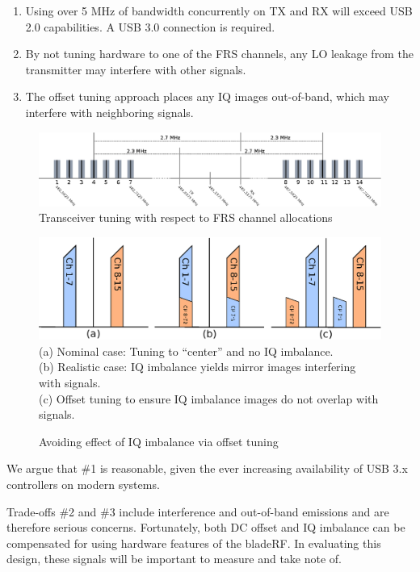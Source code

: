 \begin{enumerate}
    \item Using over 5 MHz of bandwidth concurrently on TX and RX will exceed USB 2.0 capabilities. A USB 3.0 connection is required.
    \item By not tuning hardware to one of the \ac{FRS} channels, any LO leakage from the transmitter may interfere with other signals.
    \item The offset tuning approach places any IQ images out-of-band, which may interfere with neighboring signals.
\end{enumerate}

\begin{figure}[t]
  \centering
  \includegraphics{images/frs/tuning.eps}
  \caption{Transceiver tuning with respect to FRS channel allocations}
  \label{fig:tuning}
\end{figure}

\begin{figure}[h]
  \centering
  \includegraphics[width=6in]{images/frs/iq_imbalance_offset_tuning.eps}
  \\
  \footnotesize{
    (a) Nominal case: Tuning to ``center'' and no IQ imbalance.\\
    (b) Realistic case: IQ imbalance yields mirror images interfering with signals.\\
    (c) Offset tuning to ensure IQ imbalance images do not overlap with signals.
  }
  \caption{Avoiding effect of IQ imbalance via offset tuning}
  \label{fig:iq_imbalance}
\end{figure}

We argue that \#1 is reasonable, given the ever increasing availability of USB 3.x controllers on modern systems.

Trade-offs \#2 and \#3 include interference and out-of-band emissions and are
therefore serious concerns. Fortunately, both DC offset and IQ imbalance can be
compensated for using hardware features of the bladeRF. In evaluating this
design, these signals will be important to measure and take note of.

